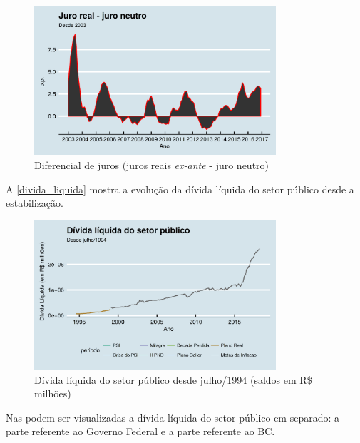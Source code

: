 \documentclass[
	10pt,				%
	openright,			%
	twoside,			%
	a5paper,			%
	english,			%
	french,				%
	spanish,			%
	brazil				%
	]{abntex2}
\begin{document}
\begin{figure}[htbp]
\caption{Diferencial de juros (juros reais \emph{ex-ante} - juro neutro)}\label{dif_juros}
\begin{center}
\includegraphics[width=0.80000\textwidth]{imagens/dif_juros.png}
\end{center}
\end{figure}

A \autoref{divida_liquida} mostra a evolução da dívida líquida do setor
público desde a estabilização.

\begin{figure}[htbp]
\caption{Dívida líquida do setor público desde julho/1994 (saldos em R\$ milhões)}\label{divida_liquida}
\begin{center}
\includegraphics[width=0.80000\textwidth]{imagens/divida_liquida-1.png}
\end{center}
\end{figure}

Nas  podem ser visualizadas
a dívida líquida do setor público em separado: a parte referente ao
Governo Federal e a parte referente ao BC.
\end{document}
